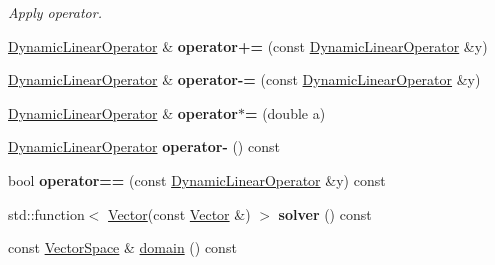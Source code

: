 \begin{DoxyCompactItemize}
\begin{DoxyCompactList}\small\item\em Apply operator. \end{DoxyCompactList}\item 
\hyperlink{classSpacy_1_1DynamicLinearOperator}{Dynamic\+Linear\+Operator} \& {\bfseries operator+=} (const \hyperlink{classSpacy_1_1DynamicLinearOperator}{Dynamic\+Linear\+Operator} \&y)\hypertarget{classSpacy_1_1DynamicLinearOperator_a6696204e09787916f1dec88319fdcdb2}{}\label{classSpacy_1_1DynamicLinearOperator_a6696204e09787916f1dec88319fdcdb2}

\item 
\hyperlink{classSpacy_1_1DynamicLinearOperator}{Dynamic\+Linear\+Operator} \& {\bfseries operator-\/=} (const \hyperlink{classSpacy_1_1DynamicLinearOperator}{Dynamic\+Linear\+Operator} \&y)\hypertarget{classSpacy_1_1DynamicLinearOperator_a8a7283da8c551442f8e4e0372e088f41}{}\label{classSpacy_1_1DynamicLinearOperator_a8a7283da8c551442f8e4e0372e088f41}

\item 
\hyperlink{classSpacy_1_1DynamicLinearOperator}{Dynamic\+Linear\+Operator} \& {\bfseries operator$\ast$=} (double a)\hypertarget{classSpacy_1_1DynamicLinearOperator_ae8fc6f0856bc0218b53a7371cf2928f4}{}\label{classSpacy_1_1DynamicLinearOperator_ae8fc6f0856bc0218b53a7371cf2928f4}

\item 
\hyperlink{classSpacy_1_1DynamicLinearOperator}{Dynamic\+Linear\+Operator} {\bfseries operator-\/} () const \hypertarget{classSpacy_1_1DynamicLinearOperator_afd842124db19f3bb9716ca4bb12a4867}{}\label{classSpacy_1_1DynamicLinearOperator_afd842124db19f3bb9716ca4bb12a4867}

\item 
bool {\bfseries operator==} (const \hyperlink{classSpacy_1_1DynamicLinearOperator}{Dynamic\+Linear\+Operator} \&y) const \hypertarget{classSpacy_1_1DynamicLinearOperator_a8f252aa5f13f636533d6f4337c4116d0}{}\label{classSpacy_1_1DynamicLinearOperator_a8f252aa5f13f636533d6f4337c4116d0}

\item 
std\+::function$<$ \hyperlink{classSpacy_1_1Vector}{Vector}(const \hyperlink{classSpacy_1_1Vector}{Vector} \&) $>$ {\bfseries solver} () const \hypertarget{classSpacy_1_1DynamicLinearOperator_a4b13c6d8ff566bd1f332aa10ca9c8064}{}\label{classSpacy_1_1DynamicLinearOperator_a4b13c6d8ff566bd1f332aa10ca9c8064}

\item 
const \hyperlink{classSpacy_1_1VectorSpace}{Vector\+Space} \& \hyperlink{classSpacy_1_1DynamicLinearOperator_aa5882565e1a88f20a16f7e7a27df3015}{domain} () const \hypertarget{classSpacy_1_1DynamicLinearOperator_aa5882565e1a88f20a16f7e7a27df3015}{}\label{classSpacy_1_1DynamicLinearOperator_aa5882565e1a88f20a16f7e7a27df3015}


\end{DoxyCompactItemize}
